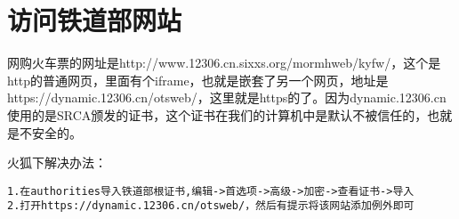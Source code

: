 \section{访问铁道部网站}
网购火车票的网址是http://www.12306.cn.sixxs.org/mormhweb/kyfw/，这个是http的普通网页，里面有个iframe，也就是嵌套了另一个网页，地址是https://dynamic.12306.cn/otsweb/，这里就是https的了。因为dynamic.12306.cn使用的是SRCA颁发的证书，这个证书在我们的计算机中是默认不被信任的，也就是不安全的。


火狐下解决办法：
\begin{verbatim}
1.在authorities导入铁道部根证书,编辑->首选项->高级->加密->查看证书->导入
2.打开https://dynamic.12306.cn/otsweb/，然后有提示将该网站添加例外即可
\end{verbatim}
